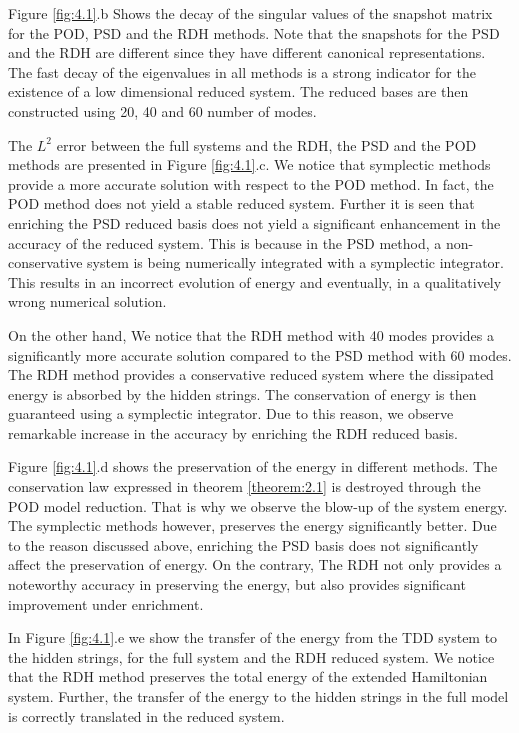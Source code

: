 Figure \ref{fig:4.1}.b Shows the decay of the singular values of the snapshot matrix for the POD, PSD and the RDH methods. Note that the snapshots for the PSD and the RDH are different since they have different canonical representations. The fast decay of the eigenvalues in all methods is a strong indicator for the existence of a low dimensional reduced system. The reduced bases are then constructed using 20, 40 and 60 number of modes.

The $L^2$ error between the full systems and the RDH, the PSD and the POD methods are presented in Figure \ref{fig:4.1}.c. We notice that symplectic methods provide a more accurate solution with respect to the POD method. In fact, the POD method does not yield a stable reduced system.  Further it is seen that enriching the PSD reduced basis does not yield a significant enhancement in the accuracy of the reduced system. This is because in the PSD method, a non-conservative system is being numerically integrated with a symplectic integrator. This results in an incorrect evolution of energy and eventually, in a qualitatively wrong numerical solution.

On the other hand, We notice that the RDH method with 40 modes provides a significantly more accurate solution compared to the PSD method with 60 modes. The RDH method provides a conservative reduced system where the dissipated energy is absorbed by the hidden strings. The conservation of energy is then guaranteed using a symplectic integrator. Due to this reason, we observe remarkable increase in the accuracy by enriching the RDH reduced basis.

Figure \ref{fig:4.1}.d shows the preservation of the energy in different methods. The conservation law expressed in theorem \ref{theorem:2.1} is destroyed through the POD model reduction. That is why we observe the blow-up of the system energy. The symplectic methods however, preserves the energy significantly better. Due to the reason discussed above, enriching the PSD basis does not significantly affect the preservation of energy. On the contrary, The RDH not only provides a noteworthy accuracy in preserving the energy, but also provides significant improvement under enrichment.

In Figure \ref{fig:4.1}.e we show the transfer of the energy from the TDD system to the hidden strings, for the full system and the RDH reduced system. We notice that the RDH method preserves the total energy of the extended Hamiltonian system. Further, the transfer of the energy to the hidden strings in the full model is correctly translated in the reduced system.

